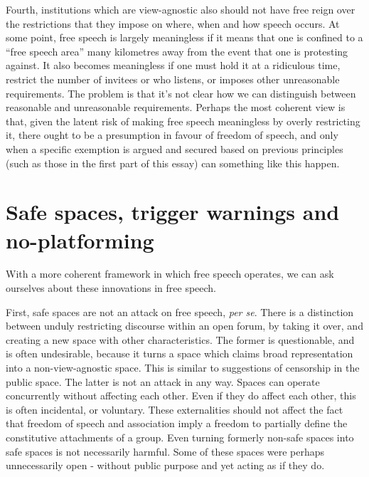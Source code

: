 \documentclass[10pt,a4paper,twoside]{article}
\begin{document}
\begin{multicols}{2}
Fourth, institutions which are view-agnostic also should not have free
reign over the restrictions that they impose on where, when and how
speech occurs. At some point, free speech is largely meaningless if it
means that one is confined to a ``free speech area'' many kilometres
away from the event that one is protesting against. It also becomes
meaningless if one must hold it at a ridiculous time, restrict the
number of invitees or who listens, or imposes other unreasonable
requirements. The problem is that it's not clear how we can distinguish
between reasonable and unreasonable requirements. Perhaps the most
coherent view is that, given the latent risk of making free speech
meaningless by overly restricting it, there ought to be a presumption in
favour of freedom of speech, and only when a specific exemption is
argued and secured based on previous principles (such as those in the
first part of this essay) can something like this happen.

\section{Safe spaces, trigger warnings and
	no-platforming}\label{safe-spaces-trigger-warnings-and-no-platforming}

With a more coherent framework in which free speech operates, we can ask
ourselves about these innovations in free speech.

First, safe spaces are not an attack on free speech, \emph{per se}.
There is a distinction between unduly restricting discourse within an
open forum, by taking it over, and creating a new space with other
characteristics. The former is questionable, and is often undesirable,
because it turns a space which claims broad representation into a
non-view-agnostic space. This is similar to suggestions of censorship in
the public space. The latter is not an attack in any way. Spaces can
operate concurrently without affecting each other. Even if they do
affect each other, this is often incidental, or voluntary. These
externalities should not affect the fact that freedom of speech and
association imply a freedom to partially define the constitutive
attachments of a group. Even turning formerly non-safe spaces into safe
spaces is not necessarily harmful. Some of these spaces were perhaps
unnecessarily open - without public purpose and yet acting as if they
do.


\end{multicols}
\end{document}
